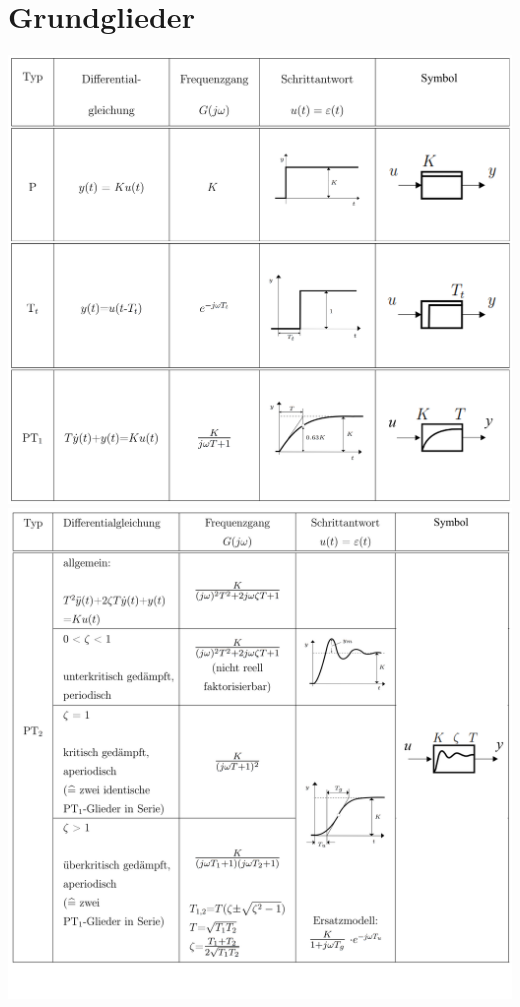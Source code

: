 \section{Grundglieder }
\includegraphics[width=12 cm]{./bilder/glieder1.png} \newpage
\includegraphics[width=12 cm]{./bilder/glieder2.png} \\\\
